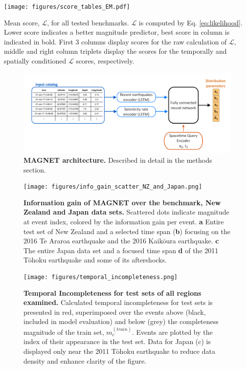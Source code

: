 \documentclass[pdflatex]{sn-jnl}
\begin{document}
\newpage
\begin{table}[h!]
    \centering
    \texttt{[image: figures/score\_tables\_EM.pdf]}
    \caption{Mean score, $\mathcal{L}$, for all tested benchmarks. $\mathcal{L}$ is computed by Eq. \ref{eq:likelihood}. Lower score indicates a better magnitude predictor, best score in column is indicated in bold. First 3 columns display scores for the raw calculation of $\mathcal{L}$, middle and right column triplets display the scores for the temporally and spatially conditioned $\mathcal{L}$ scores, respectively.
    }
    \label{tab:mean_ll_all_benchmarks}
\end{table}



\newpage
\begin{figure}[h!]
    \centering
    \includegraphics[width=1\textwidth]{figures/detailed_architecture.png}
    \caption{\textbf{MAGNET architecture.} Described in detail in the methods section.}
    \label{fig:architecture}
\end{figure}

\newpage
\begin{figure}[h!]
	\centering
        \texttt{[image: figures/info\_gain\_scatter\_NZ\_and\_Japan.png]}
	\caption{
            \textbf{Information gain of MAGNET over the benchmark, New Zealand and Japan data sets.} Scattered dots indicate magnitude at event index, colored by the information gain per event. \textbf{a} Entire test set of New Zealand and a selected time span (\textbf{b}) focusing on the 2016 Te Araroa earthquake and the 2016 Kaikōura earthquake. \textbf{c} The entire Japan data set and a focused time span \textbf{d} of the 2011 Tōhoku earthquake and some of its aftershocks. 
         }
\label{fig:nz_japan_info_gain}
\end{figure}

\newpage
\begin{figure}[h!]
    \centering
        \texttt{[image: figures/temporal\_incompleteness.png]}
    \caption{
    \textbf{Temporal Incompleteness for test sets of all regions examined.} Calculated temporal incompleteness for test sets is presented in red, superimposed over the events above (black, included in model evaluation) and below (grey) the completeness magnitude of the train set, $m_c^{(train)}$. Events are plotted by the index of their appearance in the test set. Data for Japan (c) is displayed only near the 2011 Tōhoku earthquake to reduce data density and enhance clarity of the figure.
    }
    \label{fig:temp_incompleteness}
\end{figure}
\end{document}
